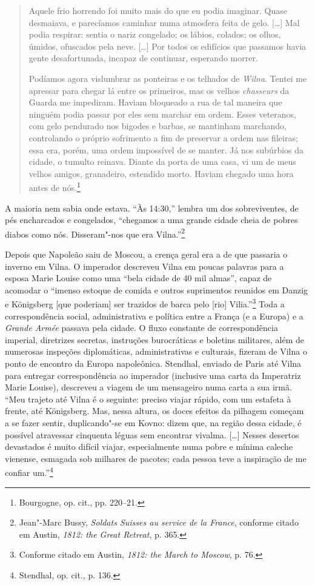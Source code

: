 \begin{quote}
Aquele frio horrendo foi muito mais do que eu podia imaginar. Quase
desmaiava, e parecíamos caminhar numa atmosfera feita de gelo. [\ldots{}]
Mal podia respirar: sentia o nariz congelado; os lábios, colados; os
olhos, úmidos, ofuscados pela neve. [\ldots{}] Por todos os edifícios que
passamos havia gente desafortunada, incapaz de continuar, esperando
morrer.

Podíamos agora vislumbrar as ponteiras e os telhados de \textit{Wilna}. Tentei me
apressar para chegar lá entre os primeiros, mas os velhos
\textit{chasseurs} da Guarda me impediram. Haviam bloqueado a rua de tal
maneira que ninguém podia passar por eles sem marchar em ordem. Esses
veteranos, com gelo pendurado nos bigodes e barbas, se mantinham
marchando, controlando o próprio sofrimento a fim de preservar a ordem
nas fileiras; essa era, porém, uma ordem impossível de se manter. Já nos
subúrbios da cidade, o tumulto reinava. Diante da porta de uma casa, vi
um de meus velhos amigos, granadeiro, estendido morto. Haviam chegado
uma hora antes de nós.\footnote{Bourgogne, op. cit., pp. 220--21.}
\end{quote}

A maioria nem sabia onde estava. ``Às 14:30,'' lembra um dos
sobreviventes, de pés encharcados e congelados, ``chegamos a uma grande
cidade cheia de pobres diabos como nós. Disseram"-nos que era
Vilna.''\footnote{Jean"-Marc Bussy, \textit{Soldats Suisses au service de la France}, conforme citado em Austin, \textit{1812: the Great Retreat}, p. 365.}

\asterisc

Depois que Napoleão saiu de Moscou, a crença geral era a de que passaria
o inverno em Vilna. O imperador descreveu Vilna em poucas palavras para
a esposa Marie Louise como uma ``bela cidade de 40 mil almas'', capaz de
acomodar o ``imenso estoque de comida e outros suprimentos reunidos em
Danzig e Königsberg {[}que poderiam{]} ser trazidos de barca pelo
{[}rio{]} Vilia.''\footnote{Conforme citado em Austin, \textit{1812: the March to Moscow}, p. 76.} Toda a correspondência social, administrativa e política entre a França (e a Europa) e a \textit{Grande
Armée} passava pela cidade. O fluxo constante de correspondência
imperial, diretrizes secretas, instruções burocráticas e boletins
militares, além de numerosas inspeções diplomáticas, administrativas e
culturais, fizeram de Vilna o ponto de encontro da Europa napoleônica.
Stendhal, enviado de Paris até Vilna para entregar correspondência ao
imperador (inclusive uma carta da Imperatriz Marie Louise), descreveu a
viagem de um mensageiro numa carta a sua irmã. ``Meu trajeto até Vilna é
o seguinte: preciso viajar rápido, com um estafeta à frente, até
Königsberg. Mas, nessa altura, os doces efeitos da pilhagem começam a se
fazer sentir, duplicando"-se em Kovno: dizem que, na região dessa cidade,
é possível atravessar cinquenta léguas sem encontrar vivalma. [\ldots{}]
Nesses desertos devastados é muito difícil viajar, especialmente numa
pobre e mínima caleche vienense, esmagada sob milhares de pacotes; cada
pessoa teve a inspiração de me confiar um.''\footnote{Stendhal, op. cit., p. 136.}

